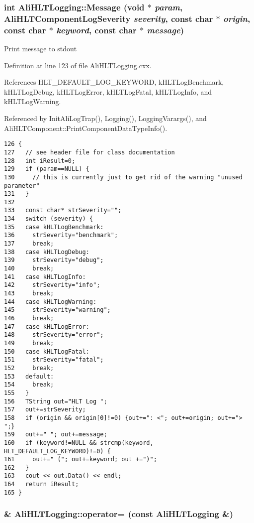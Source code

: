 \subsubsection{\setlength{\rightskip}{0pt plus 5cm}int Ali\-HLTLogging::Message (void $\ast$ {\em param}, {\bf Ali\-HLTComponent\-Log\-Severity} {\em severity}, const char $\ast$ {\em origin}, const char $\ast$ {\em keyword}, const char $\ast$ {\em message})\hspace{0.3cm}{\tt  [static]}}\label{classAliHLTLogging_e4}


Print message to stdout 

Definition at line 123 of file Ali\-HLTLogging.cxx.

References HLT\_\-DEFAULT\_\-LOG\_\-KEYWORD, k\-HLTLog\-Benchmark, k\-HLTLog\-Debug, k\-HLTLog\-Error, k\-HLTLog\-Fatal, k\-HLTLog\-Info, and k\-HLTLog\-Warning.

Referenced by Init\-Ali\-Log\-Trap(), Logging(), Logging\-Varargs(), and Ali\-HLTComponent::Print\-Component\-Data\-Type\-Info().

\footnotesize\begin{verbatim}126 {
127   // see header file for class documentation
128   int iResult=0;
129   if (param==NULL) {
130     // this is currently just to get rid of the warning "unused parameter"
131   }
132 
133   const char* strSeverity="";
134   switch (severity) {
135   case kHLTLogBenchmark: 
136     strSeverity="benchmark";
137     break;
138   case kHLTLogDebug:
139     strSeverity="debug";
140     break;
141   case kHLTLogInfo:
142     strSeverity="info";
143     break;
144   case kHLTLogWarning:
145     strSeverity="warning";
146     break;
147   case kHLTLogError:
148     strSeverity="error";
149     break;
150   case kHLTLogFatal:
151     strSeverity="fatal";
152     break;
153   default:
154     break;
155   }
156   TString out="HLT Log ";
157   out+=strSeverity;
158   if (origin && origin[0]!=0) {out+=": <"; out+=origin; out+="> ";}
159   out+=" "; out+=message;
160   if (keyword!=NULL && strcmp(keyword, HLT_DEFAULT_LOG_KEYWORD)!=0) {
161     out+=" ("; out+=keyword; out +=")";
162   }
163   cout << out.Data() << endl;
164   return iResult;
165 }
\end{verbatim}\normalsize 


\subsubsection{ \& Ali\-HLTLogging::operator= (const {\bf Ali\-HLTLogging} \&)}\label{classAliHLTLogging_a2}




